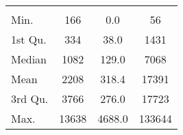 \begin{tabular}{lS[table-format=5.1]S[table-format=5.1]S[table-format=5.1]}
&  &  &  \\
 Min.    & 166 & 0.0 & 56 \\
 1st Qu. & 334 & 38.0 & 1431 \\
 Median  & 1082 & 129.0 & 7068 \\
 Mean    & 2208 & 318.4 & 17391 \\
 3rd Qu. & 3766 & 276.0 & 17723 \\
 Max.    & 13638 & 4688.0 & 133644 \\
\end{tabular}

